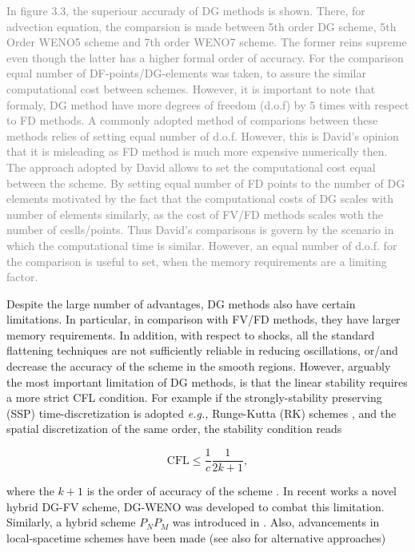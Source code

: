 \textcolor{gray}{In figure 3.3, the superiour accurady of DG methods is shown. There, for advection equation, the comparsion is made between 5th order DG scheme, 5th Order WENO5 scheme and 7th order WENO7 scheme. The former reins supreme even though the latter has a higher formal order of accuracy. For the comparison equal number of DF-points/DG-elements was taken, to assure the similar computational cost between schemes. However, it is important to note that formaly, DG method have more degrees of freedom (d.o.f) by 5 times with respect to FD methods. A commonly adopted method of comparions between these methods relies of setting equal number of d.o.f. However, this is David's opinion that it is misleading as FD method is much more expensive numerically then. The approach adopted by David allows to set the computational cost equal between the scheme. By setting equal number of FD points to the number of DG elements motivated by the fact that the computational costs of DG scales with number of elements similarly, as the cost of FV/FD methods scales woth the number of ceslls/points. Thus David's comparisons is govern by the scenario in which the computational time is similar. However, an equal number of d.o.f. for the comparison is useful to set, when the memory requirements are a limiting factor.}

Despite the large number of advantages, DG methods also have certain limitations. In particular, in comparison with FV/FD methods, they have larger memory requirements. In addition, with respect to shocks, all the standard flattening techniques are not sufficiently reliable in reducing oscillations, or/and decrease the accuracy of the scheme in the smooth regions. 
However, arguably the most important limitation of DG methods, is that the linear stability requires a more strict CFL condition. For example if the strongly-stability preserving (SSP) time-discretization is adopted \textit{e.g.,} Runge-Kutta (RK) schemes \cite{Gottlieb:2009}, and the spatial discretization of the same order, the stability condition reads

\begin{equation}
\text{CFL} \leq \frac{1}{c}\frac{1}{2k + 1},
\end{equation}

where the $k+1$ is the order of accuracy of the scheme \cite{Cockburn:2001}. In recent works  \cite{Qiu:2005,Qiu:2004} a novel hybrid DG-FV scheme, DG-WENO was developed to combat this limitation. Similarly, a hybrid scheme $P_N P_M$ was introduced in \cite{Dumbser:2009,Dumbser:2008}. Also, advancements in local-spacetime schemes have been made \cite{Gassner:2011} (see also \cite{Hesthaven:2007} for alternative approaches)



